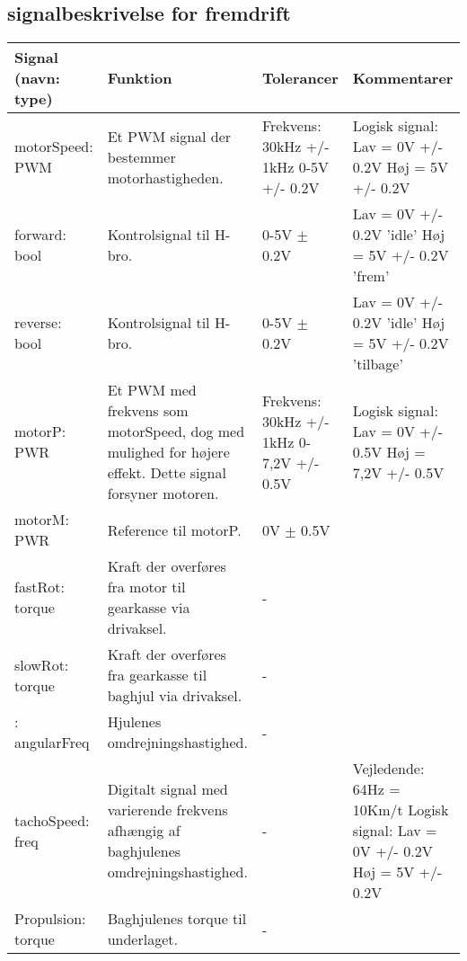 \subsection{signalbeskrivelse for fremdrift}

\begin{table}[h]
	\centering
	\begin{tabularx}{\textwidth}{|l|X|X|X|} \hline
	\textbf{Signal (navn: type)} & \textbf{Funktion} & \textbf{Tolerancer} & \textbf{Kommentarer} \\ \hline
motorSpeed: PWM
	& Et PWM signal der bestemmer motorhastigheden. 
	& Frekvens: 30kHz +/- 1kHz 0-5V +/- 0.2V
 	& Logisk signal: \newline
		Lav = 0V +/- 0.2V \newline
		Høj = 5V +/- 0.2V
	\\ \hline

forward: bool
	& Kontrolsignal til H-bro.
	& 0-5V $\pm$ 0.2V
	& Lav = 0V +/- 0.2V  ’idle’ \newline
		Høj =  5V +/- 0.2V  ’frem’
	\\ \hline
	
reverse: bool
	& Kontrolsignal til H-bro.
	& 0-5V $\pm$ 0.2V
	& Lav = 0V +/- 0.2V ’idle’ \newline
		Høj =  5V +/- 0.2V  ’tilbage’
	\\ \hline
	
motorP: PWR
	& Et PWM med frekvens som motorSpeed, dog med mulighed for højere effekt. 			Dette signal forsyner motoren.
	& Frekvens: 30kHz +/- 1kHz 0-7,2V +/- 0.5V

 	& Logisk signal: \newline
		Lav = 0V +/- 0.5V \newline 
		Høj = 7,2V +/- 0.5V
	\\ \hline

motorM: PWR
	& Reference til motorP.
	& 0V $\pm$ 0.5V
	& ~
	\\ \hline
	
fastRot: torque
	& Kraft der overføres fra motor til gearkasse via drivaksel.
	& - 
	& ~
	\\ \hline
	
slowRot: torque
	& Kraft der overføres fra gearkasse til baghjul via drivaksel.
	& - 
	& ~
	\\ \hline
	
: angularFreq
	& Hjulenes omdrejningshastighed.
	& - 
	& ~
	\\ \hline
	
tachoSpeed: freq
	& Digitalt signal med varierende frekvens afhængig af baghjulenes 					omdrejningshastighed.
	& - 
	& Vejledende: \newline
		64Hz = 10Km/t \newline
		Logisk signal: \newline
		Lav = 0V +/- 0.2V \newline
		Høj = 5V +/- 0.2V

	\\ \hline
	
Propulsion: torque
	& Baghjulenes torque til underlaget.
	& - 
	& ~
	\end{tabularx}
\end{table}